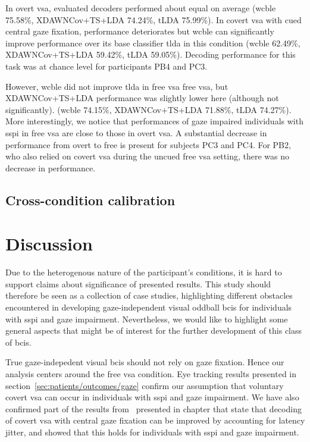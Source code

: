 In overt \ac{vsa}, evaluated decoders performed about equal on average
(\ac{wcble} 75.58\%, XDAWNCov+TS+LDA 74.24\%, tLDA 75.99\%).
In covert \ac{vsa} with cued central gaze fixation, performance deteriorates
but \ac{wcble} can significantly improve performance over its base classifier
\ac{tlda} in this condition
(\ac{wcble} 62.49\%, XDAWNCov+TS+LDA 59.42\%, tLDA 59.05\%).
Decoding performance for this task was at chance level for participants PB4 and
PC3.

However, \Ac{wcble} did not improve \ac{tlda} in free \ac{vsa} free \ac{vsa}, but
XDAWNCov+TS+LDA performance was slightly lower here (although not
significantly).
(\ac{wcble} 74.15\%, XDAWNCov+TS+LDA 71.88\%, tLDA 74.27\%).
More interestingly, we notice that performances of gaze impaired individuals
with \ac{sspi} in free \ac{vsa} are close to those in overt \ac{vsa}.
A substantial decrease in performance from overt to free is present for
subjects PC3 and PC4.
For PB2, who also relied on covert \ac{vsa} during the uncued free \ac{vsa}
setting, there was no decrease in performance.

\subsection{Cross-condition calibration}
\label{sec:patients/outcomes/cross}


\section{Discussion}

Due to the heterogenous nature of the participant's conditions, it is hard to support
claims about significance of presented results.
This study should therefore be seen as a collection of case studies,
highlighting different obstacles encountered in developing gaze-independent
visual oddball \acp{bci} for individuals with \ac{sspi} and gaze impairment.
Nevertheless, we would like to highlight some general aspects that might be
of interest for the further development of this class of \acp{bci}.

True gaze-indepedent visual \acp{bci} should not rely on gaze fixation.
Hence our analysis centers around the free \ac{vsa} condition.
Eye tracking results presented in section~\ref{sec:patients/outcomes/gaze}
confirm our assumption that voluntary covert \ac{vsa} can
occur in individuals with \ac{sspi} and gaze impairment.
We have also confirmed part of the results from~\textcite{VanDenKerchove2024} presented in
chapter that state that decoding of covert \ac{vsa} with central gaze
fixation can be improved by accounting for latency jitter, and showed that this
holds for individuals with \ac{sspi} and gaze impairment.

